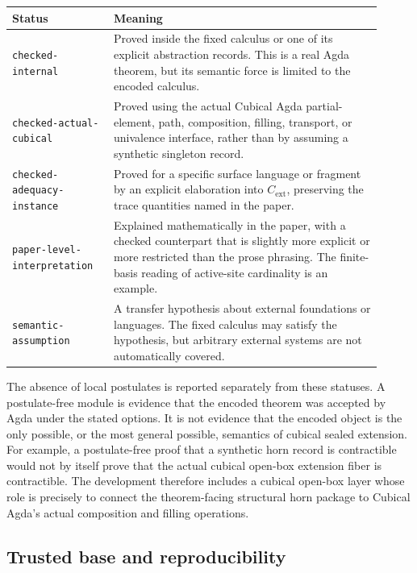 \begin{center}
\small
\setlength{\tabcolsep}{3pt}
\begin{tabular}{p{0.25\linewidth}p{0.66\linewidth}}
\hline
Status & Meaning \\
\hline
\texttt{checked-internal}
& Proved inside the fixed calculus or one of its explicit abstraction records.  This is a
real Agda theorem, but its semantic force is limited to the encoded calculus. \\
\hline
\texttt{checked-actual-cubical}
& Proved using the actual Cubical Agda partial-element, path, composition, filling,
transport, or univalence interface, rather than by assuming a synthetic singleton record. \\
\hline
\texttt{checked-adequacy-instance}
& Proved for a specific surface language or fragment by an explicit elaboration into
\(C_{\mathrm{ext}}\), preserving the trace quantities named in the paper. \\
\hline
\texttt{paper-level-interpretation}
& Explained mathematically in the paper, with a checked counterpart that is slightly more
explicit or more restricted than the prose phrasing.  The finite-basis reading of active-site
cardinality is an example. \\
\hline
\texttt{semantic-assumption}
& A transfer hypothesis about external foundations or languages.  The fixed calculus may
satisfy the hypothesis, but arbitrary external systems are not automatically covered. \\
\hline
\end{tabular}
\end{center}

The absence of local postulates is reported separately from these statuses.  A postulate-free
module is evidence that the encoded theorem was accepted by Agda under the stated options.  It
is not evidence that the encoded object is the only possible, or the most general possible,
semantics of cubical sealed extension.  For example, a postulate-free proof that a synthetic
horn record is contractible would not by itself prove that the actual cubical open-box extension
fiber is contractible.  The development therefore includes a cubical open-box layer whose role
is precisely to connect the theorem-facing structural horn package to Cubical Agda's actual
composition and filling operations.

\subsection{Trusted base and reproducibility}
\label{subsec:trusted-base-reproducibility}

